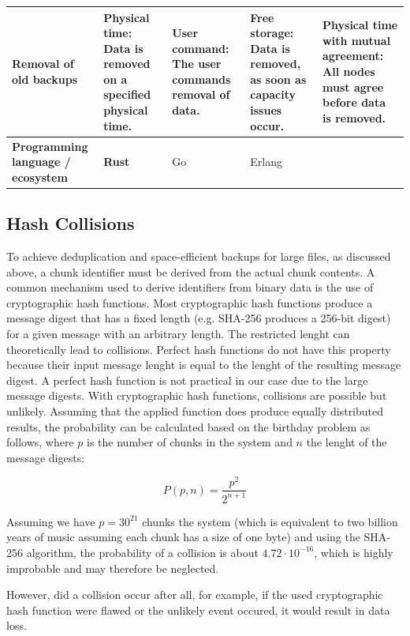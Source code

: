 \begin{table}
\begin{tabu}{X | X X X X}
          \textbf{Removal of old backups}
          & \textbf{Physical time}: Data is removed on a specified physical time.
          & User command: The user commands removal of data.
          & Free storage: Data is removed, as soon as capacity issues occur.
          & Physical time with mutual agreement: All \glspl{node} must agree before data is removed.
          \\ \hline


          \textbf{Programming language / ecosystem}
          & \textbf{Rust}
          & Go
          & Erlang
          & 
          \\ \hline
	\end{tabu}
\end{table}

\subsection{Hash Collisions}\label{sec:hash-collisions}
To achieve deduplication and space-efficient backups for large files, as discussed above, a chunk identifier must be derived from the actual chunk contents. 
A common mechanism used to derive identifiers from binary data is the use of cryptographic hash functions. Most cryptographic hash functions produce a message digest that has a fixed length (e.g. SHA-256\cite{sha-256} produces a 256-bit digest) for a given message with an arbitrary length. The restricted lenght can theoretically lead to collisions.
Perfect hash functions do not have this property because their input message lenght is equal to the lenght of the resulting message digest. A perfect hash function is not practical in our case due to the large message digests.
With cryptographic hash functions, collisions are possible but unlikely. Assuming that the applied function does produce equally distributed results, the probability can be calculated based on the birthday problem\cite{birthday-attack} as follows, where $p$ is the number of chunks in the system and $n$ the lenght of the message digests:

\[
P(p, n) = \frac{p^2}{2^{n+1}}
\]

Assuming we have $p=30^{21}$ chunks the system (which is equivalent to two billion years of music assuming each chunk has a size of one byte\cite{seagate-zetabyte}) and using the SHA-256 algorithm, the probability of a collision is about $4.72 \cdot 10^{-16}$, which is highly improbable and may therefore be neglected.

However, did a collision occur after all, for example, if the used cryptographic hash function were flawed or the unlikely event occured, it would result in data loss.

